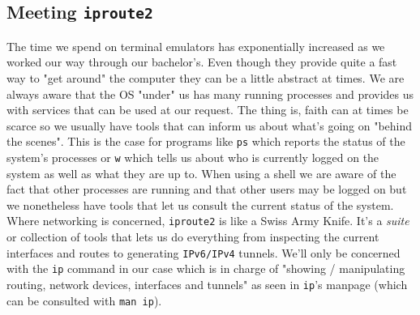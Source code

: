         \subsection{Meeting \texttt{iproute2}}
            The time we spend on terminal emulators has exponentially increased as we worked our way through our bachelor's. Even though they provide quite a fast way to "get around" the computer they can be a little abstract at times. We are always aware that the OS "under" us has many running processes and provides us with services that can be used at our request. The thing is, faith can at times be scarce so we usually have tools that can inform us about what's going on "behind the scenes". This is the case for programs like \texttt{ps} which reports the status of the system's processes or \texttt{w} which tells us about who is currently logged on the system as well as what they are up to. When using a shell we are aware of the fact that other processes are running and that other users may be logged on but we nonetheless have tools that let us consult the current status of the system.\\

            Where networking is concerned, \texttt{iproute2} is like a Swiss Army Knife. It's a \textit{suite} or collection of tools that lets us do everything from inspecting the current interfaces and routes to generating \texttt{IPv6/IPv4} tunnels. We'll only be concerned with the \texttt{ip} command in our case which is in charge of "showing / manipulating routing, network devices, interfaces and tunnels" as seen in \texttt{ip}'s manpage (which can be consulted with \texttt{man ip}).